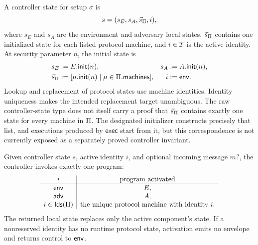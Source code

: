 \begin{definition}
\label{def:uc-controller-state}
\leanok
A controller state for setup \(\sigma\) is
\[
  s=(s_E,s_A,\vec{s}_{\Pi},i),
\]
where \(s_E\) and \(s_A\) are the environment and adversary local states,
\(\vec{s}_{\Pi}\) contains one initialized state for each listed protocol
machine, and \(i\in\mathcal{I}\) is the active identity.  At security parameter \(n\),
the initial state is
\[
\begin{aligned}
  s_E&:=E.\mathsf{init}(n),
  &s_A&:=A.\mathsf{init}(n),\\
  \vec{s}_{\Pi}&:=
    [\mu.\mathsf{init}(n)\mid\mu\in\Pi.\mathsf{machines}],
  &i&:=\mathsf{env}.
\end{aligned}
\]
Lookup and replacement of protocol states use machine identities.  Identity
uniqueness makes the intended replacement target unambiguous.
The raw controller-state type does not itself carry a proof that
\(\vec{s}_\Pi\) contains exactly one state for every machine in \(\Pi\).
The designated initializer constructs precisely that list, and executions
produced by \(\mathsf{exec}\) start from it, but this correspondence is not
currently exposed as a separately proved controller invariant.
\end{definition}

\begin{definition}
\label{def:uc-component-activation}
\leanok
Given controller state \(s\), active identity \(i\), and optional incoming
message \(m?\), the controller invokes exactly one program:
\[
\begin{array}{c|c}
  i & \text{program activated}\\ \hline
  \mathsf{env} & E,\\
  \mathsf{adv} & A,\\
  i\in\mathsf{Ids}(\Pi) & \text{the unique protocol machine with identity }i.
\end{array}
\]
The returned local state replaces only the active component's state.  If a
nonreserved identity has no runtime protocol state, activation emits no envelope
and returns control to \(\mathsf{env}\).
\end{definition}

